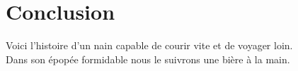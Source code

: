 \section{Conclusion}
Voici l'histoire d'un nain capable de courir vite et de voyager loin.\\
Dans son épopée formidable nous le suivrons une bière à la main.\\
